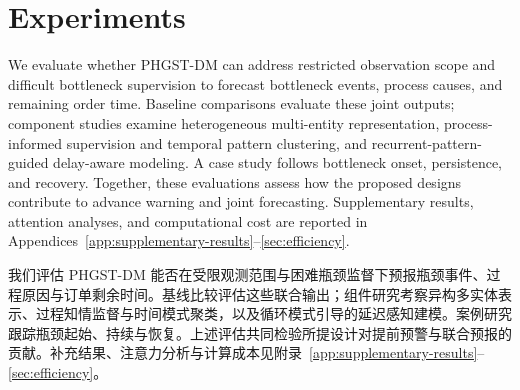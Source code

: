 \documentclass[a4paper,fleqn]{cas-dc}
\newcommand{\zhpara}[1]{%
  \par\begingroup\small\color{black!72}\noindent #1\par\endgroup}
\begin{document}
\FloatBarrier
\setcounter{topnumber}{4}
\setcounter{bottomnumber}{3}
\setcounter{totalnumber}{7}
\setcounter{dbltopnumber}{4}
\renewcommand{\topfraction}{0.9}
\renewcommand{\bottomfraction}{0.85}
\renewcommand{\textfraction}{0.08}
\renewcommand{\floatpagefraction}{0.7}
\renewcommand{\dbltopfraction}{0.9}
\renewcommand{\dblfloatpagefraction}{0.85}
\setlength{\floatsep}{10pt plus 2pt minus 2pt}
\setlength{\textfloatsep}{12pt plus 2pt minus 3pt}
\setlength{\dblfloatsep}{10pt plus 2pt minus 2pt}
\setlength{\dbltextfloatsep}{12pt plus 2pt minus 3pt}
\makeatletter
\def\@dbflt#1{\@ifnextchar[{\@xdblfloat{#1}}{%
  \edef\reserved@a{\noexpand\@xdblfloat{#1}[\csname fps@#1\endcsname]}%
  \reserved@a}}
\setlength{\@fpsep}{12pt plus 2pt minus 2pt}
\setlength{\@dblfpsep}{12pt plus 2pt minus 2pt}
\makeatother
\raggedbottom

\section{Experiments}\label{sec:exp}

We evaluate whether PHGST-DM can address restricted observation scope and difficult bottleneck supervision to forecast bottleneck events, process causes, and remaining order time. Baseline comparisons evaluate these joint outputs; component studies examine heterogeneous multi-entity representation, process-informed supervision and temporal pattern clustering, and recurrent-pattern-guided delay-aware modeling. A case study follows bottleneck onset, persistence, and recovery. Together, these evaluations assess how the proposed designs contribute to advance warning and joint forecasting. Supplementary results, attention analyses, and computational cost are reported in Appendices~\ref{app:supplementary-results}--\ref{sec:efficiency}.

\zhpara{我们评估 PHGST-DM 能否在受限观测范围与困难瓶颈监督下预报瓶颈事件、过程原因与订单剩余时间。基线比较评估这些联合输出；组件研究考察异构多实体表示、过程知情监督与时间模式聚类，以及循环模式引导的延迟感知建模。案例研究跟踪瓶颈起始、持续与恢复。上述评估共同检验所提设计对提前预警与联合预报的贡献。补充结果、注意力分析与计算成本见附录~\ref{app:supplementary-results}--\ref{sec:efficiency}。}
\end{document}
